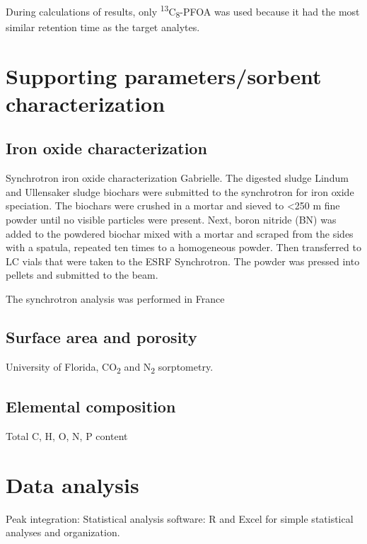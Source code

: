 During calculations of results, only \textsuperscript{13}C\textsubscript{8}-PFOA was used because it had the most similar retention time as the target analytes. 


\section{Supporting parameters/sorbent characterization}

\subsection{Iron oxide characterization}
Synchrotron iron oxide characterization Gabrielle.
The digested sludge Lindum and Ullensaker sludge biochars were submitted to the synchrotron for iron oxide speciation. The biochars were crushed in a mortar and sieved to \textless 250 \textmu m fine powder until no visible particles were present. Next, boron nitride (BN) was added to the powdered biochar mixed with a mortar and scraped from the sides with a spatula, repeated ten times to a homogeneous powder. Then transferred to LC vials that were taken to the ESRF Synchrotron. The powder was pressed into pellets and submitted to the beam.

The synchrotron analysis was performed in France

\subsection{Surface area and porosity}
University of Florida, CO\textsubscript{2} and N\textsubscript{2} sorptometry. 

\subsection{Elemental composition}
Total C, H, O, N, P content



\section{Data analysis}
Peak integration: 
Statistical analysis software: R and Excel for simple statistical analyses and organization. 

